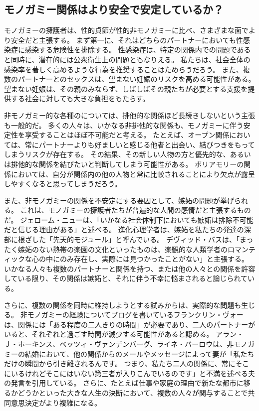 \documentclass[paper=a4,book,openany]{jlreq}
\begin{document}
\subsection{モノガミー関係はより安全で安定しているか？}

モノガミーの擁護者は、性的貞節が性的非モノガミーに比べ、さまざまな面でより安全だと主張する。
まず第一に、それはどちらのパートナーにおいても性感染症に感染する危険性を排除する。
性感染症は、特定の関係内での問題であると同時に、潜在的には公衆衛生上の問題ともなりえる。
私たちは、社会全体の感染率を著しく高めるような行為を推奨することはためらうだろう。
また、複数のパートナーとのセックスは、望まない妊娠のリスクを高める可能性がある。
望まない妊娠は、その親のみならず、しばしばその親たちが必要とする支援を提供する社会に対しても大きな負担をもたらす。

非モノガミー的な各種のについては、排他的な関係ほど長続きしないという主張も一般的だ。
多くの人々は、いかなる非排他的な関係も、モノガミーに伴う安定性を享受することはほぼ不可能だと考える。
たとえば、オープン関係においては、常にパートナーよりも好ましいと感じる他者と出会い、結びつきをもってしまうリスクが存在する。
その結果、その新しい人物の方と優先的な、あるいは排他的な関係を結びたいと判断してしまう可能性がある。
ポリアモリーの関係においては、自分が関係内の他の人物と常に比較されることにより欠点が露呈しやすくなると思ってしまうだろう。

また、非モノガミーの関係を不安定にする要因として、嫉妬の問題が挙げられる。
これは、モノガミーの擁護者たちが普遍的な人間の感情だと主張するものだ。
ジェローム・ニューは、「いかなる社会体制下においても嫉妬は排除不可能だと信じる理由がある」と述べる\citep[p.43]{new00:_jealous_thoug}。
進化心理学者は、嫉妬を私たちの発達の深部に根ざした「先天的モジュール」と呼んでいる。
デヴィッド・バスは、「まったく嫉妬のない熱帯の楽園の文化といったものは、楽観的な人類学者のロマンティックな心の中にのみ存在し、実際には見つかったことがない」と主張する\citep[p.961]{buss01:_human_natur_cultur}。
いかなる人々も複数のパートナーと関係を持つ、または他の人々との関係を許容している限り、その関係は嫉妬と、それに伴う不幸に悩まされると論じられている。

さらに、複数の関係を同時に維持しようとする試みからは、実際的な問題も生じる。
非モノガミーの経験についてブログを書いているフランクリン・ヴォーは、関係には「ある程度の二人きりの時間」が必要であり、二人のパートナーがいると、それぞれと過ごす時間が減少する可能性があると認める\citep{veaux09:_some_musin_time_manag}。
アラン・Ｊ・ホーキンス、ベッツィ・ヴァンデンバーグ、ライネ・バーロウは、非モノガミーの結婚において、他の関係からのメールやメッセージによって妻が「私たちだけの瞬間から引き離されるんです。
つまり、私たち二人の関係に、常にそこにいるけれどそこにはいない第三者が入りこんでいるのです」と不満を述べる夫の発言を引用している\citep{hawkins17:_new_math_consen_nonmon}。
さらに、たとえば仕事や家庭の理由で新たな都市に移るかどうかといった大きな人生の決断において、複数の人々が関与することで共同意思決定がより複雑になる。
\end{document}
